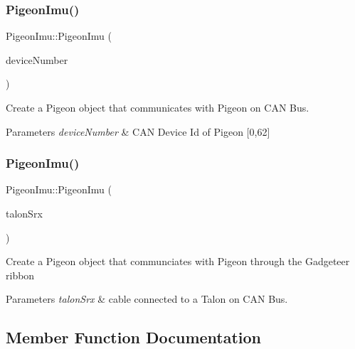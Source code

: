 \subsubsection{\texorpdfstring{Pigeon\+Imu()}{PigeonImu()}\hspace{0.1cm}{\footnotesize\ttfamily [1/2]}}
{\footnotesize\ttfamily Pigeon\+Imu\+::\+Pigeon\+Imu (\begin{DoxyParamCaption}\item[{int}]{device\+Number }\end{DoxyParamCaption})}

Create a Pigeon object that communicates with Pigeon on C\+AN Bus. 
\begin{DoxyParams}{Parameters}
{\em device\+Number} & C\+AN Device Id of Pigeon \mbox{[}0,62\mbox{]} \\
\hline
\end{DoxyParams}
\mbox{\label{class_pigeon_imu_ac8622c6a54ac5763d80a662b82826aa1}} 
\subsubsection{\texorpdfstring{Pigeon\+Imu()}{PigeonImu()}\hspace{0.1cm}{\footnotesize\ttfamily [2/2]}}
{\footnotesize\ttfamily Pigeon\+Imu\+::\+Pigeon\+Imu (\begin{DoxyParamCaption}\item[{\hyperlink{class_c_a_n_talon}{C\+A\+N\+Talon} $\ast$}]{talon\+Srx }\end{DoxyParamCaption})}

Create a Pigeon object that communciates with Pigeon through the Gadgeteer ribbon 
\begin{DoxyParams}{Parameters}
{\em talon\+Srx} & cable connected to a Talon on C\+AN Bus. \\
\hline
\end{DoxyParams}


\subsection{Member Function Documentation}
\mbox{\label{class_pigeon_imu_aa83b1c10badcc495e5a29b520b0a6ac7}} 
